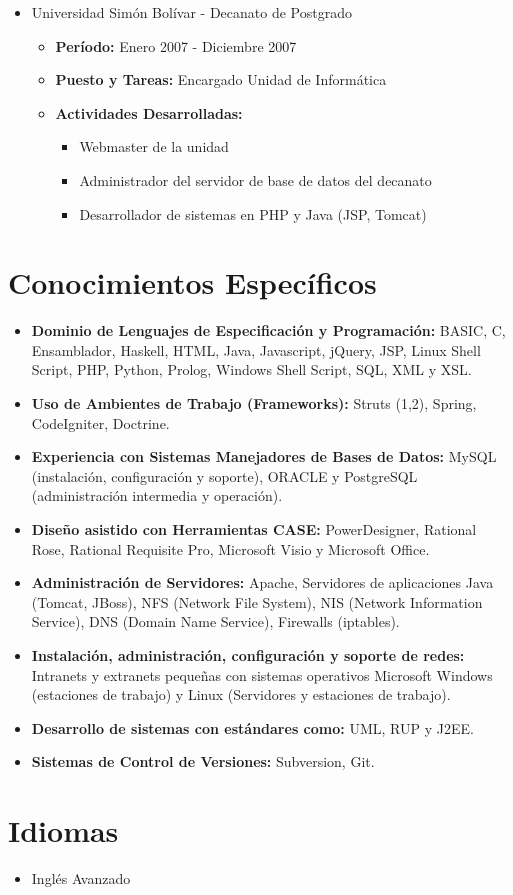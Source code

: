 \documentclass[letterpaper,12pt]{report}
\begin{document}
\begin{itemize}
        \item{Universidad Simón Bolívar - Decanato de Postgrado}
        \begin{itemize}
            \item{\textbf{Período:} Enero 2007 - Diciembre 2007}
            \item{\textbf{Puesto y Tareas:} Encargado Unidad de Informática}
            \item{\textbf{Actividades Desarrolladas:}}
            \begin{itemize}
                \item Webmaster de la unidad
                \item Administrador del servidor de base de datos del decanato
                \item Desarrollador de sistemas en PHP y Java (JSP, Tomcat)
            \end{itemize}
        \end{itemize}

    \end{itemize}


\section{Conocimientos Específicos}

    \begin{itemize}
    \item
    \textbf{Dominio de Lenguajes de Especificación y Programación:} BASIC, C, Ensamblador, Haskell, HTML, Java, Javascript, jQuery, JSP, Linux Shell Script, PHP, Python, Prolog, Windows Shell Script, SQL, XML y XSL.
    \item
    \textbf{Uso de Ambientes de Trabajo (Frameworks):} Struts (1,2), Spring, CodeIgniter, Doctrine.
    \item
    \textbf{Experiencia con Sistemas Manejadores de Bases de Datos:} MySQL (instalación, configuración y soporte), ORACLE y PostgreSQL (administración intermedia y operación).
    \item
    \textbf{Dise\~{n}o asistido con Herramientas CASE:} PowerDesigner, Rational Rose, Rational Requisite Pro, Microsoft Visio y Microsoft Office.
    \item
    \textbf{Administración de Servidores:} Apache, Servidores de aplicaciones Java (Tomcat, JBoss), NFS (Network File System), NIS (Network Information Service), DNS (Domain Name Service), Firewalls (iptables).
    \item
    \textbf{Instalación, administración, configuración y soporte de redes:} Intranets y extranets peque\~{n}as con sistemas operativos Microsoft Windows (estaciones de trabajo) y Linux (Servidores y estaciones de trabajo).
    \item
    \textbf{Desarrollo de sistemas con estándares como:} UML, RUP y J2EE.
    \item
    \textbf{Sistemas de Control de Versiones:} Subversion, Git.
    \end{itemize}

\section{Idiomas}
\begin{itemize}
    \item Inglés Avanzado
\end{itemize}
\end{document}
